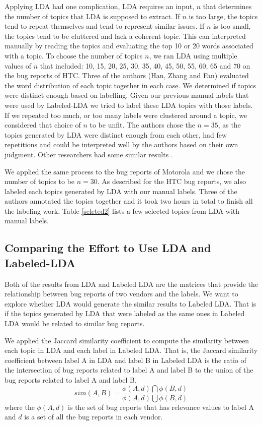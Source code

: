 \documentclass[10pt, conference, compsocconf]{IEEEtran}
\begin{document}
Applying LDA had one complication, LDA requires an input, $n$ that
determines the number of topics that LDA is supposed to extract. If
$n$ is too large, the topics tend to repeat themselves and tend to
represent similar issues. If $n$ is too small, the topics tend to
be cluttered and lack a coherent topic. This can interpreted manually
by reading the topics and evaluating the top 10 or 20 words associated
with a topic.
To choose the number of topics $n$, we ran LDA using multiple values
of $n$ that included: 10, 15, 20, 25, 30, 35, 40, 45, 50, 55, 60, 65
and 70 on the bug reports of HTC. 
Three of the authors (Han, Zhang and Fan) evaluated the word distribution of each topic
together in each case. 
We determined if topics were distinct enough based on labelling. Given
our previous manual labels that were used by Labeled-LDA we tried to label these LDA topics
with those labels. If we repeated too much, or too many labels were
clustered around a topic, we considered that choice of $n$ to be unfit.
The authors chose the $n = 35$, as the topics generated by LDA
were distinct enough from each other, had few repetitions and could be
interpreted well by the authors based on their own judgment.
Other researchers had some similar results
\cite{Thomas:2011,Hindle2011,Hindle}. 

We applied the same process to the bug reports of Motorola and we chose
the number of topics to be $n = 30$. 
As described for the HTC bug reports, we also labeled each topics
generated by LDA with our manual labels.
Three of the authors annotated the topics together and it took two
hours in total to finish all the labeling work. 
Table \ref{seleted2} lists a few selected topics from LDA with manual labels.


\subsection{Comparing the Effort to Use LDA and Labeled-LDA}
Both of the results from LDA and Labeled LDA are the matrices that
provide the relationship between bug reports of two vendors and the
labels. 
We want to explore whether LDA would generate the similar results to
Labeled LDA. 
That is if the topics generated by LDA that were labeled as the same
ones in Labeled LDA would be related to similar bug reports.

We applied the Jaccard similarity coefficient to compute the
similarity between each topic in LDA and each label in Labeled LDA. 
That is, the Jaccard similarity coefficient between label A in LDA and
label B in Labeled LDA is the ratio of the intersection of bug reports
related to label A and label B to the union of the bug reports related
to label A and label B,
\begin{equation}
sim(A,B) = \frac{\phi(A,d)\bigcap\phi(B,d)}{\phi(A,d)\bigcup\phi(B,d)}
\end{equation}
where the $\phi(A,d)$ is the set of bug reports that has relevance
values to label A and $d$ is a set of all the bug reports in each
vendor.
\end{document}
